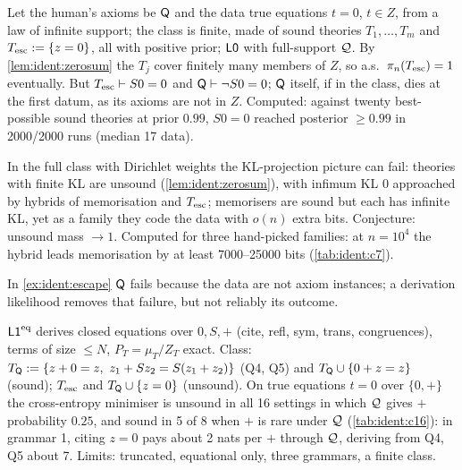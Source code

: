 \begin{example}\identbrk{}\label{ex:ident:escape}
Let the human's axioms be $\mathsf{Q}$ and the data true equations $t=0$, $t\in Z$, from a law of infinite support; the class is finite, made of sound theories $T_1,\dots,T_m$ and $T_{\mathrm{esc}}:=\{z=0\}$, all with positive prior; $\mathord{\mathsf{L0}}$ with full-support $\mathcal{Q}$. By \cref{lem:ident:zerosum} the $T_j$ cover finitely many members of $Z$, so a.s.\ $\pi_n(T_{\mathrm{esc}})=1$ eventually. But $T_{\mathrm{esc}}\vdash S0=0$ and $\mathsf{Q}\vdash\neg S0=0$; $\mathsf{Q}$ itself, if in the class, dies at the first datum, as its axioms are not in $Z$. Computed: against twenty best-possible sound theories at prior $0.99$, $S0=0$ reached posterior $\ge0.99$ in 2000/2000 runs (median 17 data).
\end{example}

\begin{remark}\identbrk{}\label{rem:ident:fullclass}
In the full class with Dirichlet weights the KL-projection picture can fail: theories with finite KL are unsound (\cref{lem:ident:zerosum}), with infimum KL $0$ approached by hybrids of memorisation and $T_{\mathrm{esc}}$; memorisers are sound but each has infinite KL, yet as a family they code the data with $o(n)$ extra bits. Conjecture: unsound mass $\to1$. Computed for three hand-picked families: at $n=10^4$ the hybrid leads memorisation by at least 7000--25000 bits (\cref{tab:ident:c7}).
\end{remark}

\noindent In \cref{ex:ident:escape} $\mathsf{Q}$ fails because the data are not axiom instances; a derivation likelihood removes that failure, but not reliably its outcome.

\begin{example}\identbrk{}\label{ex:ident:lonedq}
$\mathord{\mathsf{L1}}^{\mathrm{eq}}$ derives closed equations over $0,S,+$ (cite, refl, sym, trans, congruences), terms of size $\le N$, $P_T=\mu_T/Z_T$ exact. Class: $T_\Q:=\{z+0=z,\ z_1+Sz_2=S(z_1+z_2)\}$ (Q4, Q5) and $T_{\mathsf{Q}}\cup\{0+z=z\}$ (sound); $T_{\mathrm{esc}}$ and $T_{\mathsf{Q}}\cup\{z=0\}$ (unsound). On true equations $t=0$ over $\{0,+\}$ the cross-entropy minimiser is unsound in all 16 settings in which $\mathcal{Q}$ gives $+$ probability $0.25$, and sound in 5 of 8 when $+$ is rare under $\mathcal{Q}$ (\cref{tab:ident:c16}): in grammar 1, citing $z=0$ pays about 2 nats per $+$ through $\mathcal{Q}$, deriving from Q4, Q5 about 7. Limits: truncated, equational only, three grammars, a finite class.
\end{example}

